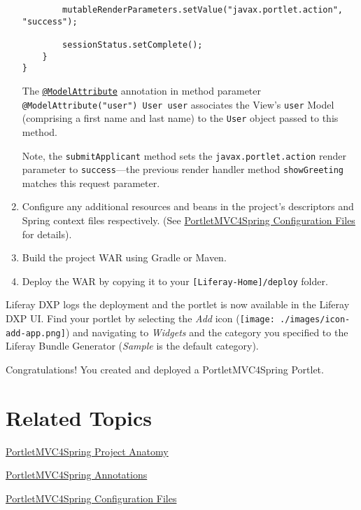 \begin{enumerate}
\begin{verbatim}
        mutableRenderParameters.setValue("javax.portlet.action", "success");

        sessionStatus.setComplete();
    }
}
\end{verbatim}

  The
  \href{https://docs.spring.io/spring/docs/current/javadoc-api/org/springframework/web/bind/annotation/ModelAttribute.html}{\texttt{@ModelAttribute}}
  annotation in method parameter
  \texttt{@ModelAttribute("user")\ User\ user} associates the View's
  \texttt{user} Model (comprising a first name and last name) to the
  \texttt{User} object passed to this method.

  Note, the \texttt{submitApplicant} method sets the
  \texttt{javax.portlet.action} render parameter to
  \texttt{success}---the previous render handler method
  \texttt{showGreeting} matches this request parameter.
\item
  Configure any additional resources and beans in the project's
  descriptors and Spring context files respectively. (See
  \href{/docs/7-2/reference/-/knowledge_base/r/portletmvc4spring-configuration-files}{PortletMVC4Spring
  Configuration Files} for details).
\item
  Build the project WAR using Gradle or Maven.
\item
  Deploy the WAR by copying it to your
  \texttt{{[}Liferay-Home{]}/deploy} folder.
\end{enumerate}

Liferay DXP logs the deployment and the portlet is now available in the
Liferay DXP UI. Find your portlet by selecting the \emph{Add} icon
(\texttt{[image: ./images/icon-add-app.png]}) and navigating to
\emph{Widgets} and the category you specified to the Liferay Bundle
Generator (\emph{Sample} is the default category).

Congratulations! You created and deployed a PortletMVC4Spring Portlet.

\section{Related Topics}\label{related-topics-9}

\href{/docs/7-2/reference/-/knowledge_base/r/portletmvc4spring-project-anatomy}{PortletMVC4Spring
Project Anatomy}

\href{/docs/7-2/reference/-/knowledge_base/r/portletmvc4spring-annotations}{PortletMVC4Spring
Annotations}

\href{/docs/7-2/reference/-/knowledge_base/r/portletmvc4spring-configuration-files}{PortletMVC4Spring
Configuration Files}

